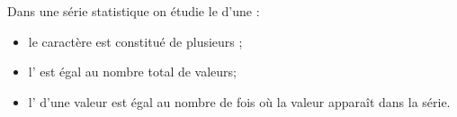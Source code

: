 Dans une série statistique on étudie le  d'une
 :
\begin{itemize}
    \item le caractère est constitué de plusieurs ;
    \item l' est égal au nombre total de
    valeurs;
    \item l' d'une valeur est égal au nombre de fois
    où la valeur apparaît dans la série.
\end{itemize}